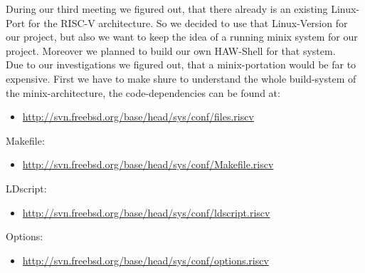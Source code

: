 During our third meeting we figured out, that there already is an existing Linux-Port for the RISC-V architecture. So we decided to use that Linux-Version for our project, but also we want to keep the idea of a running minix system for our project. Moreover we planned to build our own HAW-Shell for that system.\\
Due to our investigations we figured out, that a minix-portation would be far to expensive. First we have to make shure to understand the whole build-system of the minix-architecture, the code-dependencies can be found at:\\
\begin{itemize}
\item \url{http://svn.freebsd.org/base/head/sys/conf/files.riscv}
\end{itemize}
Makefile:
\begin{itemize}
\item \url{http://svn.freebsd.org/base/head/sys/conf/Makefile.riscv}
\end{itemize}
LDscript:
\begin{itemize}
\item \url{http://svn.freebsd.org/base/head/sys/conf/ldscript.riscv}
\end{itemize}
Options:
\begin{itemize}
\item \url{http://svn.freebsd.org/base/head/sys/conf/options.riscv}
\end{itemize}